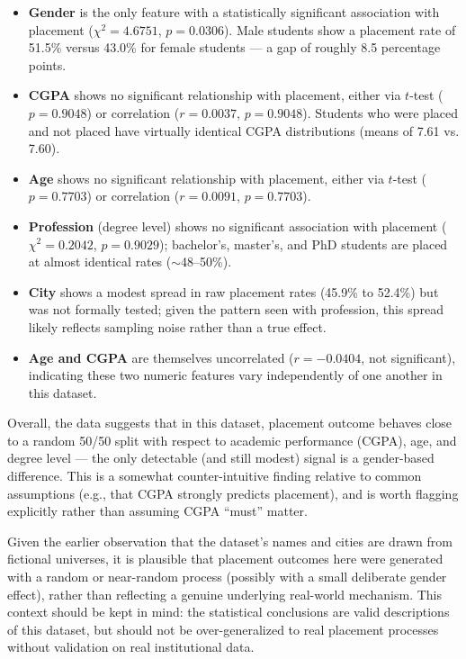 \documentclass[11pt]{article}
\begin{document}
\begin{itemize}[leftmargin=1.2cm]
    \item \textbf{Gender} is the only feature with a statistically significant association with placement ($\chi^2 = 4.6751$, $p = 0.0306$). Male students show a placement rate of 51.5\% versus 43.0\% for female students --- a gap of roughly 8.5 percentage points.
    \item \textbf{CGPA} shows no significant relationship with placement, either via $t$-test ($p = 0.9048$) or correlation ($r = 0.0037$, $p = 0.9048$). Students who were placed and not placed have virtually identical CGPA distributions (means of 7.61 vs. 7.60).
    \item \textbf{Age} shows no significant relationship with placement, either via $t$-test ($p = 0.7703$) or correlation ($r = 0.0091$, $p = 0.7703$).
    \item \textbf{Profession} (degree level) shows no significant association with placement ($\chi^2 = 0.2042$, $p = 0.9029$); bachelor's, master's, and PhD students are placed at almost identical rates ($\sim$48--50\%).
    \item \textbf{City} shows a modest spread in raw placement rates (45.9\% to 52.4\%) but was not formally tested; given the pattern seen with profession, this spread likely reflects sampling noise rather than a true effect.
    \item \textbf{Age and CGPA} are themselves uncorrelated ($r = -0.0404$, not significant), indicating these two numeric features vary independently of one another in this dataset.
\end{itemize}

Overall, the data suggests that in this dataset, placement outcome behaves close to a random 50/50 split with respect to academic performance (CGPA), age, and degree level --- the only detectable (and still modest) signal is a gender-based difference. This is a somewhat counter-intuitive finding relative to common assumptions (e.g., that CGPA strongly predicts placement), and is worth flagging explicitly rather than assuming CGPA ``must'' matter.

Given the earlier observation that the dataset's names and cities are drawn from fictional universes, it is plausible that placement outcomes here were generated with a random or near-random process (possibly with a small deliberate gender effect), rather than reflecting a genuine underlying real-world mechanism. This context should be kept in mind: the statistical conclusions are valid descriptions of this dataset, but should not be over-generalized to real placement processes without validation on real institutional data.
\end{document}
